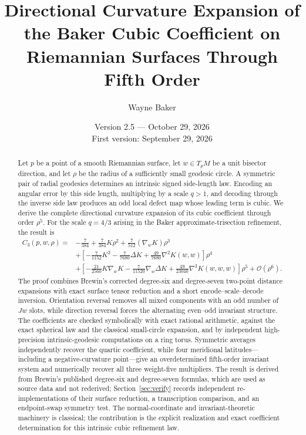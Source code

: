\documentclass[11pt]{amsart}
\title[Directional curvature expansion]{Directional Curvature Expansion of the Baker Cubic Coefficient on Riemannian Surfaces Through Fifth Order}
\author{Wayne Baker}
\date{Version 2.5 --- October 29, 2026\\ First version: September 29, 2026}
\numberwithin{equation}{section}
\theoremstyle{remark}
\newcommand{\bigO}{\mathcal{O}}
\begin{document}
\begin{abstract}
Let $p$ be a point of a smooth Riemannian surface, let $w\in T_pM$ be a unit bisector direction, and let $\rho$ be the radius of a sufficiently small geodesic circle.  A symmetric pair of radial geodesics determines an intrinsic signed side-length law.  Encoding an angular error by this side length, multiplying by a scale $q>1$, and decoding through the inverse side law produces an odd local defect map whose leading term is cubic.  We derive the complete directional curvature expansion of its cubic coefficient through order $\rho^5$.  For the scale $q=4/3$ arising in the Baker approximate-trisection refinement, the result is
\[
\begin{aligned}
C_3(p,w,\rho)
={}&-\frac7{384}+\frac7{384}K\rho^2
+\frac7{512}(\nabla_wK)\rho^3\\
&+\left[-\frac7{1152}K^2-\frac7{7680}\Delta K
+\frac{49}{7680}\nabla^2K(w,w)\right]\rho^4\\
&+\left[-\frac{21}{2560}K\nabla_wK
-\frac7{11520}\nabla_w\Delta K
+\frac{49}{23040}\nabla^3K(w,w,w)\right]\rho^5
+\bigO(\rho^6).
\end{aligned}
\]
The proof combines Brewin's corrected degree-six and degree-seven two-point distance expansions with exact surface tensor reduction and a short encode--scale--decode inversion.  Orientation reversal removes all mixed components with an odd number of $Jw$ slots, while direction reversal forces the alternating even--odd invariant structure.  The coefficients are checked symbolically with exact rational arithmetic, against the exact spherical law and the classical small-circle expansion, and by independent high-precision intrinsic-geodesic computations on a ring torus.  Symmetric averages independently recover the quartic coefficient, while four meridional latitudes---including a negative-curvature point---give an overdetermined fifth-order invariant system and numerically recover all three weight-five multipliers.  The result is derived from Brewin's published degree-six and degree-seven formulas, which are used as source data and not rederived; Section~\ref{sec:verify} records independent re-implementations of their surface reduction, a transcription comparison, and an endpoint-swap symmetry test. The normal-coordinate and invariant-theoretic machinery is classical; the contribution is the explicit realization and exact coefficient determination for this intrinsic cubic refinement law.
\end{abstract}

\maketitle
\end{document}
